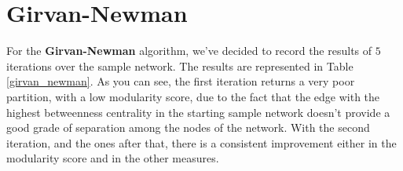 
\section{Girvan-Newman} %
\label{sec:girvan_newman}
    For the \textbf{Girvan-Newman} algorithm, we've decided to record the results of $5$ iterations over the sample
    network. The results are represented in Table \ref{girvan_newman}. As you can see, the first iteration
    returns a very poor partition, with a low modularity score, due to the fact that the edge with the highest
    betweenness centrality in the starting sample network doesn't provide a good grade of separation among the nodes
    of the network. With the second iteration, and the ones after that, there is a consistent improvement either in
    the modularity score and in the other measures.
